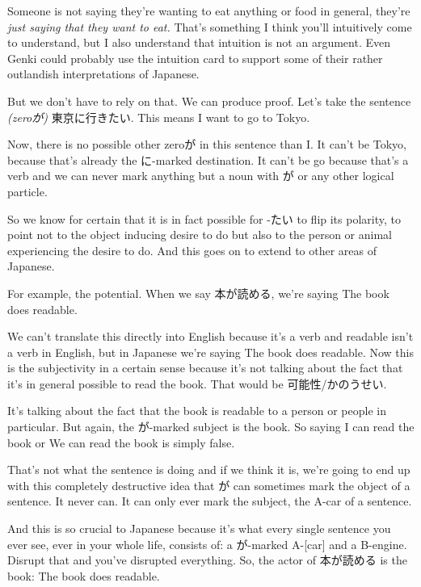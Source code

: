Someone is not saying they're wanting to eat anything or food in general, they're {\em just saying that they want to eat.} That's something I think you'll intuitively come to understand, but I also understand that intuition is not an argument. Even Genki could probably use the intuition card to support some of their rather outlandish interpretations of Japanese.

But we don't have to rely on that. We can produce proof. Let's take the sentence {\em (zeroが)} 東京に行きたい. This means I want to go to Tokyo.

{}

Now, there is no possible other zeroが in this sentence than I. It can't be Tokyo, because that's already the に-marked destination. It can't be go because that's a verb and we can never mark anything but a noun with が or any other logical particle.

So we know for certain that it is in fact possible for -たい to flip its polarity, to point not to the object inducing desire to do but also to the person or animal experiencing the desire to do. And this goes on to extend to other areas of Japanese.

\thinrule

For example, the potential. When we say 本が読める, we're saying The book does readable.

{}

We can't translate this directly into English because it's a verb and readable isn't a verb in English, but in Japanese we're saying The book does readable. Now this is the subjectivity in a certain sense because it's not talking about the fact that it's in general possible to read the book. That would be 可能性/かのうせい.

It's talking about the fact that the book is readable to a person or people in particular. But again, the が-marked subject is the book. So saying I can read the book or We can read the book is simply false.

That's not what the sentence is doing and if we think it is, we're going to end up with this completely destructive idea that が can sometimes mark the object of a sentence. It never can. It can only ever mark the subject, the A-car of a sentence.

And this is so crucial to Japanese because it's what every single sentence you ever see, ever in your whole life, consists of: a が-marked A-{[}car{]} and a B-engine. Disrupt that and you've disrupted everything. So, the actor of 本が読める is the book: The book does readable.

